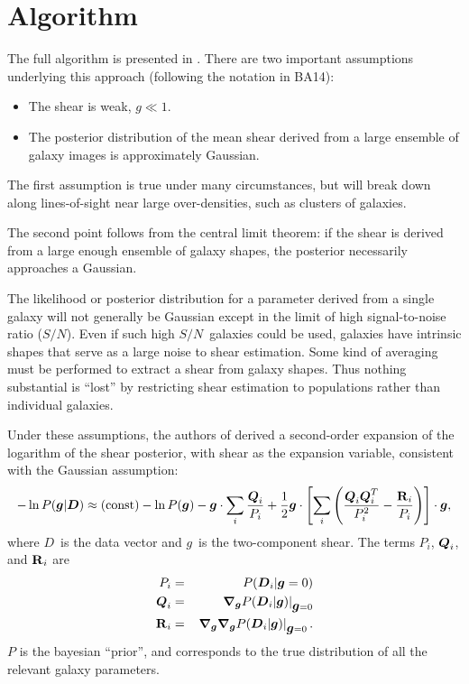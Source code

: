 \documentclass[12pt,preprint]{aastex}
\newcommand{\sn}{$S/N$}
\newcommand{\vecg}{\mbox{\boldmath $g$}}
\newcommand{\vecD}{\mbox{\boldmath $D$}}
\newcommand{\vecQ}{\mbox{\boldmath $Q$}}
\newcommand{\matR}{\mbox{$\bf R$}}
\newcommand{\bnabg}{ \boldsymbol{\nabla_g}}
\begin{document}
\section{Algorithm} \label{sec:algo}

The full algorithm is presented in \citet[][BA14]{ba14}.  There are two
important assumptions underlying this approach (following the notation in
BA14):

\begin{itemize}

    \item The shear is weak, $g \ll 1$.

    \item The posterior distribution of the mean shear derived from a large
        ensemble of galaxy images is approximately Gaussian.

\end{itemize}

The first assumption is true under many circumstances, but will break down
along lines-of-sight near large over-densities, such as clusters of galaxies.

The second point follows from the central limit theorem: if the shear is
derived from a large enough ensemble of galaxy shapes, the posterior
necessarily approaches a Gaussian.

The likelihood or posterior distribution for a parameter derived from a single
galaxy will not generally be Gaussian except in the limit of high
signal-to-noise ratio (\sn). Even if such high \sn\ galaxies could be used,
galaxies have intrinsic shapes that serve as a large noise to shear estimation.
Some kind of averaging must be performed to extract a shear from galaxy shapes.
Thus nothing substantial is ``lost'' by restricting shear estimation to
populations rather than individual galaxies.  

Under these assumptions, the authors of \cite{ba14} derived a second-order
expansion of the logarithm of the shear posterior, with shear as the
expansion variable, consistent with the Gaussian assumption:
\begin{equation} \label{eq:pexpand}
-\ln P(\vecg | \vecD) \approx {(\rm const)} - \ln P(\vecg) - \vecg \cdot \sum_i
    \frac{\vecQ_i}{P_i}
    + \frac{1}{2} \vecg \cdot \left[ \sum_i \left(\frac{\vecQ_i \vecQ^T_i}{P_i^2}
    - \frac{\matR_i}{P_i}\right) \right] \cdot \vecg,
\end{equation}
where \vecD\ is the data vector and \vecg\ is the two-component shear.  The
terms $P_i$, $\vecQ_i$, and $\matR_i$ are 
\begin{eqnarray} \label{eq:pqrdef}
P_i     & = & P(\vecD_i | \vecg=0) \nonumber \\
\vecQ_i & = & \left. \bnabg P(\vecD_i | \vecg)\right|_{\vecg=0} \\
\matR_i & = & \left. \bnabg \bnabg P(\vecD_i | \vecg)\right|_{\vecg=0}. \nonumber
\end{eqnarray}
$P$ is the bayesian ``prior'', and corresponds to the true distribution
of all the relevant galaxy parameters.
\end{document}
